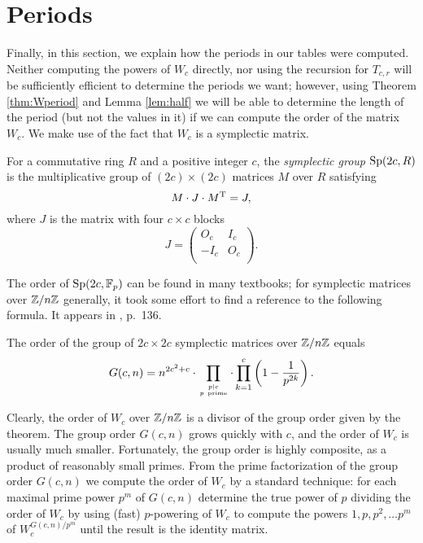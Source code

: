 \section{Periods}
Finally, in this section, we explain how the periods in our tables were
computed. Neither computing the powers of $W_c$ directly, nor using
the recursion for $T_{c,r}$ will be sufficiently efficient to determine
the periods we want; however, using Theorem \ref{thm:Wperiod} and Lemma
\ref{lem:half} we will be able to determine the length of the period
(but not the values in it) if we can compute the order of the matrix $W_c$.
We make use of the fact that $W_c$ is a symplectic matrix.
\begin{definition}
For a commutative ring $R$ and a positive integer $c$,
the {\it symplectic group} $\operatorname{Sp}(2c, R)$ is the multiplicative group of
$(2c)\times (2c)$ matrices $M$ over $R$ satisfying
$$M\cdot J\cdot M^{\operatorname{T}}=J,$$
where $J$ is the matrix with four $c\times c$ blocks
$$J=\left(\begin{matrix} O_c & I_c \\ -I_c & O_c \\\end{matrix}\right).$$
\end{definition}
The order of $\operatorname{Sp}(2c, \mathbb F_p)$
can be found in many textbooks; for symplectic matrices over
$\mathbb{Z}/n\mathbb{Z}$ generally, it took some effort to find a reference to the following
formula. It appears in \cite{newman72}, p.~136.
\begin{theorem}\label{thm:newman}
The order of the group of $2c\times 2c$ symplectic matrices over $\mathbb{Z}/n\mathbb{Z}$
equals
$$G(c,n)=n^{2c^2+c}\cdot\prod_{p\vert c\atop {p\ {\rm prime}}}\cdot\prod_{k=1}^c \left(1-\frac{1}{p^{2k}}\right).$$
\end{theorem}
Clearly, the order of $W_c$ over $\mathbb{Z}/n\mathbb{Z}$ is a divisor of the group
order given by the theorem. The group order $G(c,n)$  grows quickly with $c$,
and the order of $W_c$ is usually much smaller. Fortunately, the
group order is highly composite, as a product of reasonably small
primes. From the prime factorization of the group order $G(c, n)$ we
compute the order of $W_c$ by a standard technique: for each maximal prime 
power $p^m$ of $G(c, n)$ determine the true power of $p$ dividing the order of 
$W_c$ by using (fast) $p$-powering of $W_c$ to compute the powers $1, p, p^2, \ldots p^m$ of $W_c^{G(c,n)/p^m}$ until the result is the identity matrix.
